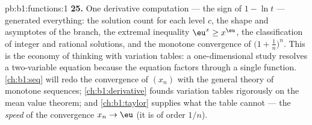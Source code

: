 \begin{solution}{pb:b1:functions:1}
\textbf{25.} One derivative computation --- the sign of $1 - \ln
t$ --- generated everything: the solution count for each level
$c$, the shape and asymptotes of the branch, the extremal
inequality $\eu^x \geq x^\eu$, the classification of integer and
rational solutions, and the monotone convergence of $\bigl(1 +
\frac1n\bigr)^n$. This is the economy of thinking with variation
tables: a one-dimensional study resolves a two-variable equation
because the equation factors through a single function.
\cref{ch:b1:seq} will redo the convergence of $(x_n)$ with the
general theory of monotone sequences; \cref{ch:b1:derivative}
founds variation tables rigorously on the mean value theorem; and
\cref{ch:b1:taylor} supplies what the table cannot --- the
\emph{speed} of the convergence $x_n \to \eu$ (it is of order
$1/n$).
\end{solution}
